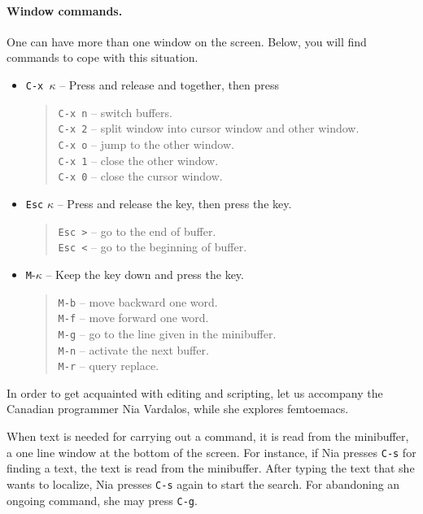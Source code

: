 \documentclass[a4paper,12pt]{book}
\begin{document}
\paragraph{Window commands.} One can have more
than one window on the screen. Below, you will
find commands to cope with this situation.
\begin{itemize}
\item \verb|C-x |$\kappa$ -- Press and release 
and  together, then press \keys{$\kappa$} 
\begin{quote}
\verb|C-x n| -- switch buffers.\\
\verb|C-x 2| -- split window into cursor window and other window.\\
\verb|C-x o| -- jump to the other window.\\
\verb|C-x 1| -- close the other window.\\
\verb|C-x 0| -- close the cursor window.
\end{quote}
\item \verb|Esc| $\kappa$ -- Press and release the  key,
then press the \keys{$\kappa$} key.
\begin{quote}
\verb|Esc >| -- go to the end of buffer.\\
\verb|Esc <| -- go to the beginning of buffer. 
\end{quote}
\item \verb|M|-$\kappa$ -- Keep the  key
down and press the \keys{$\kappa$} key.
\begin{quote}
\verb|M-b| -- move backward one word.\\
\verb|M-f| -- move forward one word.\\
\verb|M-g| -- go to the line given in the minibuffer.\\
\verb|M-n| -- activate the next buffer.\\
\verb|M-r| -- query replace.
\end{quote}
\end{itemize}


In order to get acquainted with editing and scripting,
let us accompany the Canadian programmer Nia
Vardalos, while she explores femtoemacs.

When text is needed for carrying out a command,
it is read from the minibuffer, a one line
window at the bottom of the screen. For instance, 
if Nia presses \verb|C-s| for finding a text, 
the text is read from the minibuffer. After
typing the text that she wants to localize,
Nia presses \verb|C-s| again to start the search.
For abandoning an ongoing command, she may press \verb|C-g|.
\end{document}
